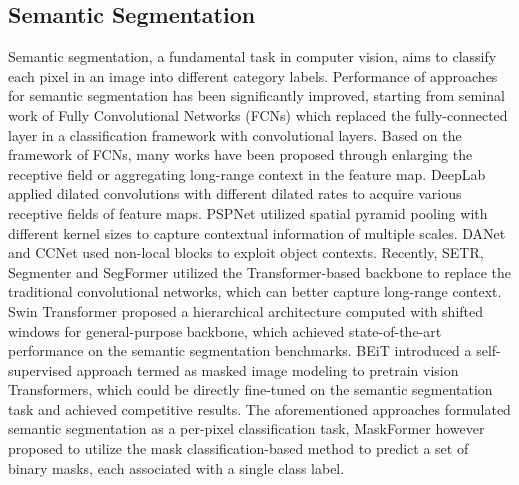 \documentclass[journal]{IEEEtran}
\begin{document}
\subsection{Semantic Segmentation}
Semantic segmentation, a fundamental task in computer vision, aims to classify each pixel in an image into different category labels\cite{fcn}. Performance of approaches for semantic segmentation has been significantly improved, starting from seminal work of Fully Convolutional Networks (FCNs) which replaced the fully-connected layer in a classification framework with convolutional layers\cite{long2015,fcn}. Based on the framework of FCNs, many works have been proposed through enlarging the receptive field or aggregating long-range context in the feature map. DeepLab\cite{deeplab,deeplabv3} applied dilated convolutions with different dilated rates to acquire various receptive fields of feature maps. PSPNet\cite{pspnet} utilized spatial pyramid pooling with different kernel sizes to capture contextual information of multiple scales. DANet\cite{fu2019dual} and CCNet\cite{huang2018ccnet,huang2020ccnet} used non-local blocks to exploit object contexts. Recently, SETR\cite{zheng2021rethinking}, Segmenter\cite{strudel2021segmenter} and SegFormer\cite{xie2021segformer} utilized the Transformer-based backbone to replace the traditional convolutional networks, which can better capture long-range context. Swin Transformer\cite{Liu_2021_ICCV} proposed a hierarchical architecture computed with shifted windows for general-purpose backbone, which achieved state-of-the-art performance on the semantic segmentation benchmarks. BEiT\cite{bao2022beit} introduced a self-supervised approach termed as masked image modeling to pretrain vision Transformers, which could be directly fine-tuned on the semantic segmentation task and achieved competitive results. The aforementioned approaches formulated semantic segmentation as a per-pixel classification task, MaskFormer\cite{cheng2021maskformer,cheng2021mask2former} however proposed to utilize the mask classification-based method to predict a set of binary masks, each associated with a single class label.
\end{document}
